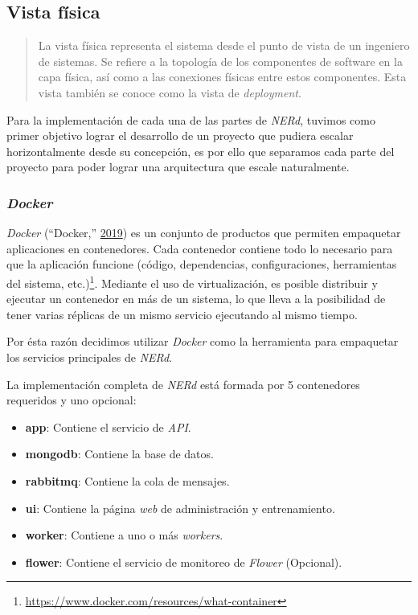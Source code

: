 \documentclass[12pt,a4paper,]{scrartcl}
\providecommand{\tightlist}{%
  \setlength{\itemsep}{0pt}\setlength{\parskip}{0pt}}
\let\rmarkdownfootnote\footnote%
\def\footnote{\protect\rmarkdownfootnote}
\begin{document}
\hypertarget{vista-fuxedsica}{%
\subsection{Vista física}\label{vista-fuxedsica}}

\begin{quote}
La vista física representa el sistema desde el punto de vista de un ingeniero de sistemas.
Se refiere a la topología de los componentes de software en la capa física, así como a las conexiones físicas entre estos componentes.
Esta vista también se conoce como la vista de \emph{deployment}.
\end{quote}

Para la implementación de cada una de las partes de \emph{NERd}, tuvimos como primer objetivo lograr el desarrollo de un proyecto que pudiera escalar horizontalmente desde su concepción, es por ello que separamos cada parte del proyecto para poder lograr una arquitectura que escale naturalmente.

\hypertarget{docker}{%
\subsubsection{\texorpdfstring{\emph{Docker}}{Docker}}\label{docker}}

\emph{Docker} (``Docker,'' \protect\hyperlink{ref-docker}{2019}) es un conjunto de productos que permiten empaquetar aplicaciones en contenedores. Cada contenedor contiene todo lo necesario para que la aplicación funcione (código, dependencias, configuraciones, herramientas del sistema, etc.)\footnote{\url{https://www.docker.com/resources/what-container}}. Mediante el uso de virtualización, es posible distribuir y ejecutar un contenedor en más de un sistema, lo que lleva a la posibilidad de tener varias réplicas de un mismo servicio ejecutando al mismo tiempo.

Por ésta razón decidimos utilizar \emph{Docker} como la herramienta para empaquetar los servicios principales de \emph{NERd}.

La implementación completa de \emph{NERd} está formada por 5 contenedores requeridos y uno opcional:

\begin{itemize}
\tightlist
\item
  \textbf{app}: Contiene el servicio de \emph{API}.
\item
  \textbf{mongodb}: Contiene la base de datos.
\item
  \textbf{rabbitmq}: Contiene la cola de mensajes.
\item
  \textbf{ui}: Contiene la página \emph{web} de administración y entrenamiento.
\item
  \textbf{worker}: Contiene a uno o más \emph{workers}.
\item
  \textbf{flower}: Contiene el servicio de monitoreo de \emph{Flower} (Opcional).
\end{itemize}
\end{document}
